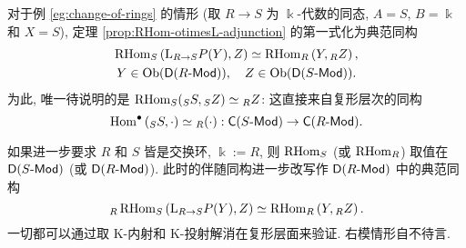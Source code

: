 \begin{example}[环变换的伴随关系]\label{eg:change-of-ring-adjunction}
	对于例 \ref{eg:change-of-rings} 的情形 (取 $R \to S$ 为 $\Bbbk$-代数的同态, $A = S$, $B = \Bbbk$ 和 $X = S$), 定理 \ref{prop:RHom-otimesL-adjunction} 的第一式化为典范同构
	\begin{gather*}
		\operatorname{RHom}_S\left( \mathrm{L} {}_{R \to S} P(Y), Z \right) \simeq \operatorname{RHom}_R\left( Y, {}_R Z \right), \\
		Y \in \operatorname{Ob}(\mathsf{D}(R\text{-}\mathsf{Mod})), \quad Z \in \operatorname{Ob}(\mathsf{D}(S\text{-}\mathsf{Mod})).
	\end{gather*}
	为此, 唯一待说明的是 $\operatorname{RHom}_S({}_S S, {}_S Z) \simeq {}_R Z$: 这直接来自复形层次的同构
	\[ \operatorname{Hom}^\bullet\left({}_S S, \cdot\right) \simeq {}_R (\cdot) : \mathsf{C}(S\text{-}\mathsf{Mod}) \to \mathsf{C}(R\text{-}\mathsf{Mod}). \]
	
	如果进一步要求 $R$ 和 $S$ 皆是交换环, $\Bbbk := R$, 则 $\operatorname{RHom}_S$ (或 $\operatorname{RHom}_R$) 取值在 $\mathsf{D}(S\text{-}\mathsf{Mod})$ (或 $\mathsf{D}(R\text{-}\mathsf{Mod})$). 此时的伴随同构进一步改写作 $\mathsf{D}(R\text{-}\mathsf{Mod})$ 中的典范同构
	\[ {}_R \operatorname{RHom}_S\left( \mathrm{L} {}_{R \to S} P(Y), Z \right) \simeq \operatorname{RHom}_R\left( Y, {}_R Z \right) . \]
	一切都可以通过取 K-内射和 K-投射解消在复形层面来验证. 右模情形自不待言.
\end{example}


